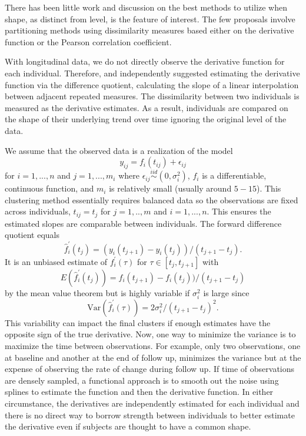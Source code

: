 \documentclass[12pt]{article}
\begin{document}
There has been little work and discussion on the best methods to utilize when shape, as distinct from level, is the feature of interest. The few proposals involve partitioning methods using dissimilarity measures based either on the derivative function or the Pearson correlation coefficient. 

With longitudinal data, we do not directly observe the derivative function for each individual. Therefore, \textcite{moller2003} and \textcite{d2000} independently suggested estimating the derivative function via the difference quotient, calculating the slope of a linear interpolation between adjacent repeated measures. The dissimilarity between two individuals is measured as the derivative estimates. As a result, individuals are compared on the shape of their underlying trend over time ignoring the original level of the data. 

We assume that the observed data is a realization of the model
$$y_{ij}= f_i(t_{ij})+\epsilon_{ij}$$
for $i=1,...,n$ and $j=1,...,m_{i}$ where $\epsilon_{ij}\overset{iid}{\sim} (0,\sigma_{i}^{2})$, $f_{i}$ is a differentiable, continuous function, and $m_{i}$ is relatively small (usually around $5-15$). This clustering method essentially requires balanced data so the observations are fixed across individuals, $t_{ij} = t_{j}$ for $j=1,..,m$ and $i=1,...,n$. This ensures the estimated slopes are comparable between individuals. The forward difference quotient equals 
$$\hat{f}_{i}^{'}(t_{j}) = (y_i(t_{j+1})-y_i(t_j))/(t_{j+1}-t_j).$$
It is an unbiased estimate of $f_{i}^{'}(\tau)$ for $\tau\in[t_{j},t_{j+1}]$ with
$$E(\hat{f}_{i}^{'}(t_{j})) = f_i(t_{j+1})-f_i(t_j))/(t_{j+1}-t_j)$$
by the mean value theorem but is highly variable if $\sigma_{i}^{2}$ is large since
$$\text{Var}(\hat{f}_{i}^{'}(\tau)) =  2\sigma^{2}_{i}/ (t_{j+1}-t_j)^{2}.$$
This variability can impact the final clusters if enough estimates have the opposite sign of the true derivative. Now, one way to minimize the variance is to maximize the time between observations. For example, only two observations, one at baseline and another at the end of follow up, minimizes the variance but at the expense of observing the rate of change during follow up. If time of observations are densely sampled, a functional approach is to smooth out the noise using splines to estimate the function and then the derivative function. In either circumstance, the derivatives are independently estimated for each individual and there is no direct way to borrow strength between individuals to better estimate the derivative even if subjects are thought to have a common shape. 
\end{document}
